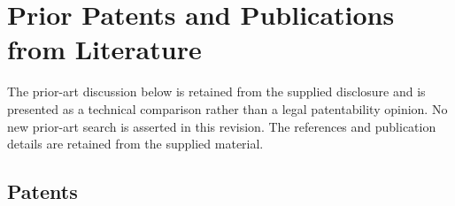 \documentclass[11pt,a4paper]{article}
\begin{document}
\section{Prior Patents and Publications from Literature}

The prior-art discussion below is retained from the supplied disclosure and is presented
as a technical comparison rather than a legal patentability opinion. No new prior-art
search is asserted in this revision. The references and publication details are retained
from the supplied material.

\subsection{Patents}
\end{document}
